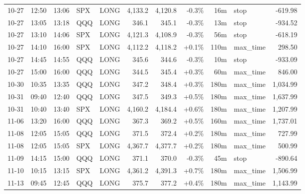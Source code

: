 \documentclass[11pt,a4paper,twoside]{article}
\begin{document}
\begin{center}
\begin{longtable}{>{\color{txtmain}}l l l l l r r r r >{\color{txtmain}}l r}
10-27 & 12:50 & 13:06 & SPX & LONG & 4,133.2 & 4,120.8 & \textcolor{lossred}{-0.3\%} & 16m & stop & \textcolor{lossred}{-619.98} \\
10-27 & 13:05 & 13:18 & QQQ & LONG & 346.1 & 345.1 & \textcolor{lossred}{-0.3\%} & 13m & stop & \textcolor{lossred}{-934.52} \\
10-27 & 13:10 & 14:06 & SPX & LONG & 4,121.3 & 4,108.9 & \textcolor{lossred}{-0.3\%} & 56m & stop & \textcolor{lossred}{-618.19} \\
10-27 & 14:10 & 16:00 & SPX & LONG & 4,112.2 & 4,118.2 & \textcolor{wingreen}{+0.1\%} & 110m & max\_time & \textcolor{wingreen}{298.50} \\
10-27 & 14:45 & 14:55 & QQQ & LONG & 345.6 & 344.6 & \textcolor{lossred}{-0.3\%} & 10m & stop & \textcolor{lossred}{-933.09} \\
10-27 & 15:00 & 16:00 & QQQ & LONG & 344.5 & 345.4 & \textcolor{wingreen}{+0.3\%} & 60m & max\_time & \textcolor{wingreen}{846.00} \\
10-30 & 10:35 & 13:35 & QQQ & LONG & 347.2 & 348.4 & \textcolor{wingreen}{+0.3\%} & 180m & max\_time & \textcolor{wingreen}{1,034.99} \\
10-31 & 09:40 & 12:40 & QQQ & LONG & 347.5 & 349.3 & \textcolor{wingreen}{+0.5\%} & 180m & max\_time & \textcolor{wingreen}{1,637.99} \\
10-31 & 10:40 & 13:40 & SPX & LONG & 4,160.2 & 4,184.4 & \textcolor{wingreen}{+0.6\%} & 180m & max\_time & \textcolor{wingreen}{1,207.99} \\
11-06 & 13:20 & 16:00 & QQQ & LONG & 367.3 & 369.2 & \textcolor{wingreen}{+0.5\%} & 160m & max\_time & \textcolor{wingreen}{1,737.01} \\
11-08 & 12:05 & 15:05 & QQQ & LONG & 371.5 & 372.4 & \textcolor{wingreen}{+0.2\%} & 180m & max\_time & \textcolor{wingreen}{727.99} \\
11-08 & 12:05 & 15:05 & SPX & LONG & 4,367.7 & 4,377.7 & \textcolor{wingreen}{+0.2\%} & 180m & max\_time & \textcolor{wingreen}{500.99} \\
11-09 & 14:15 & 15:00 & QQQ & LONG & 371.1 & 370.0 & \textcolor{lossred}{-0.3\%} & 45m & stop & \textcolor{lossred}{-890.64} \\
11-10 & 10:15 & 13:15 & SPX & LONG & 4,361.2 & 4,391.3 & \textcolor{wingreen}{+0.7\%} & 180m & max\_time & \textcolor{wingreen}{1,506.99} \\
11-13 & 09:45 & 12:45 & QQQ & LONG & 375.7 & 377.2 & \textcolor{wingreen}{+0.4\%} & 180m & max\_time & \textcolor{wingreen}{1,143.99} \\

\end{longtable}
\end{center}
\end{document}
